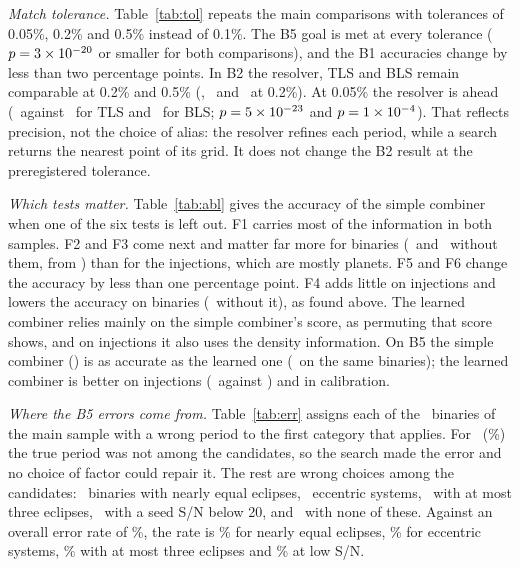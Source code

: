 \documentclass[twocolumn,linenumbers]{aastex701}
\begin{document}
\emph{Match tolerance.} Table~\ref{tab:tol} repeats the main comparisons with tolerances of 0.05\%, 0.2\% and 0.5\% instead of 0.1\%. The B5 goal is met at every tolerance ($p=3\times10^{-20}$ or smaller for both comparisons), and the B1 accuracies change by less than two percentage points. In B2 the resolver, TLS and BLS remain comparable at 0.2\% and 0.5\% (\tolTwoLooseAcc, \tolTwoLooseTls\ and \tolTwoLooseBls\ at 0.2\%). At 0.05\% the resolver is ahead (\tolTwoTightAcc\ against \tolTwoTightTls\ for TLS and \tolTwoTightBls\ for BLS; $p=5\times10^{-23}$ and $p=1\times10^{-4}$). That reflects precision, not the choice of alias: the resolver refines each period, while a search returns the nearest point of its grid. It does not change the B2 result at the preregistered tolerance.



\emph{Which tests matter.} Table~\ref{tab:abl} gives the accuracy of the simple combiner when one of the six tests is left out. F1 carries most of the information in both samples. F2 and F3 come next and matter far more for binaries (\ablFiveFtwo\ and \ablFiveFthree\ without them, from \ablFiveAll) than for the injections, which are mostly planets. F5 and F6 change the accuracy by less than one percentage point. F4 adds little on injections and lowers the accuracy on binaries (\ablFiveFfour\ without it), as found above. The learned combiner relies mainly on the simple combiner's score, as permuting that score shows, and on injections it also uses the density information. On B5 the simple combiner (\ablFiveAll) is as accurate as the learned one (\ablFiveLearned\ on the same binaries); the learned combiner is better on injections (\ablOneLearned\ against \ablOneAll) and in calibration.



\emph{Where the B5 errors come from.} Table~\ref{tab:err} assigns each of the \bFiveErrN\ binaries of the main sample with a wrong period to the first category that applies. For \bFiveErrNoCand\ (\bFiveErrNoCandPc\%) the true period was not among the candidates, so the search made the error and no choice of factor could repair it. The rest are wrong choices among the candidates: \bFiveErrTwin\ binaries with nearly equal eclipses, \bFiveErrEcc\ eccentric systems, \bFiveErrFew\ with at most three eclipses, \bFiveErrSnr\ with a seed S/N below 20, and \bFiveErrOther\ with none of these. Against an overall error rate of \bFiveErrRate\%, the rate is \bFiveErrRateTwin\% for nearly equal eclipses, \bFiveErrRateEcc\% for eccentric systems, \bFiveErrRateFew\% with at most three eclipses and \bFiveErrRateSnr\% at low S/N.
\end{document}
